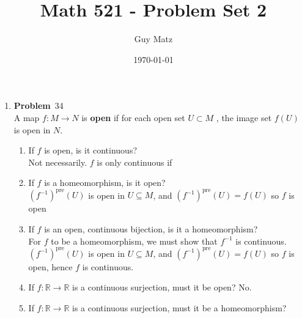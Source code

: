 \documentclass[12pt]{amsart}
\title{\textbf{Math 521 - Problem Set 2}}
\author{Guy Matz}
\date{\today}
\newcommand{\benu}{\begin{enumerate}}
\newcommand{\eenu}{\end{enumerate}}
\theoremstyle{definition}
\newcommand{\mbR}{\mathbb{R}}
\newcommand{\itep}{\item {\bfseries Problem}\ }
\begin{document}
 


\begin{enumerate}[series=p]
\itep 34 \\
A map $f:M \to N$ is \textbf{open} if for each open set $U \subset M$ , the image set $f(U)$ is open in $N$.
\\
\benu
\item If $f$ is open, is it continuous?\\
Not necessarily.  $f$ is only continuous if 
\item If $f$ is a homeomorphism, is it open?\\ %
$(f^{-1})^\text{pre}(U)$ is open in $U \subseteq M$, and $(f^{-1})^\text{pre}(U) = f(U)$ so $f$ is open
\item If $f$ is an open, continuous bijection, is it a homeomorphism?\\ %
For $f$ to be a homeomorphism, we must show that $f^{-1}$ is continuous.  $(f^{-1})^\text{pre}(U)$ is open in $U \subseteq M$, and $(f^{-1})^\text{pre}(U) = f(U)$ so $f$ is open, hence $f$ is continuous.
\item If $f : \mbR \to \mbR$ is a continuous surjection, must it be open? %
No.  
\item If $f : \mbR \to \mbR$ is a continuous surjection, must it be a homeomorphism? 
\eenu
\begin{comment}
\textbf{Definition: Openness}\\
	A set $s \subset M$ is \textbf{open in M} if for every point $p \in S$ there is an $r \in \mbR$, $r>0$, so that for every $q \in M$,
	if $d(p,q) < r$, then $q < S$
	\begin{center}
		OR
		\\
		$\forall p \in S \, \exists r > 0 (B_r^M(p) \subseteq S)$
	\end{center}
\textbf{Definition - Continuous I}
	A function $f:M \to N$ is \textbf{continuous} if whenever $(a_i)$ is a sequence in $M$ and
	$$(a_i) \to b \text{ in } M,$$
	$$f((a_i)) \to f(b) \text{ in } N$$


\textbf{Definition - Continuous II }
	A function $f:M \to N$ is \textbf{continuous} if it satisfies the $\boldsymbol{\epsilon, \delta}$ \textbf{condition}:
	$\forall \epsilon > 0 \text{ and } \forall p \in M \, \exists \delta > 0 \text{ such that }$:
	$$q \in M \text{and } d(p,q) < \delta \implies d(fp,fq) < \epsilon$$


\end{comment}
\end{enumerate}
\end{document}
